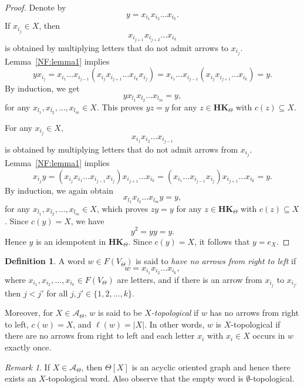 \documentclass[pdflatex,sn-mathphys-num]{sn-jnl}
\newcommand{\hk}{\mathbf{HK}_{\Theta}}
\theoremstyle{definition}
\newtheorem{definition}[theorem]{Definition}
\theoremstyle{remark}
\newtheorem{remark}[theorem]{Remark}
\begin{document}
\begin{proof}
   Denote by 
   \[
   y = x_{i_1} x_{i_2} \dots x_{i_k}.
   \]
   If $x_{i_j} \in X$, then
   \[
   x_{i_{j+1}} x_{i_{j+2}} \dots x_{i_k}
   \]
   is obtained by multiplying letters that do not admit arrows to $x_{i_j}$.
   Lemma~\ref{NF:lemma1} implies
   \[
   y x_{i_j} = x_{i_1} \dots x_{i_{j-1}} (x_{i_j} x_{i_{j+1}} \dots x_{i_k} x_{i_j}) = x_{i_1} \dots x_{i_{j-1}} (x_{i_j} x_{i_{j+1}} \dots x_{i_k}) = y.
   \]
   By induction, we get 
   \[
   y x_{l_1} x_{l_2} \dots x_{l_m} = y,
   \]
   for any $x_{l_1}, x_{l_2}, \dots, x_{l_m} \in X$.
   This proves $yz = y$ for any $z \in \hk$ with $c(z) \subseteq X$.

   For any $x_{i_j} \in X$,
   \[
   x_{i_1} x_{i_2} \dots x_{i_{j-1}}
   \]
   is obtained by multiplying letters that do not admit arrows from $x_{i_j}$.
   Lemma~\ref{NF:lemma1} implies
   \[
   x_{i_j} y = (x_{i_j} x_{i_1} \dots x_{i_{j-1}} x_{i_j}) x_{i_{j+1}} \dots x_{i_k} = (x_{i_1} \dots x_{i_{j-1}} x_{i_j}) x_{i_{j+1}} \dots x_{i_k} = y.
   \]
   By induction, we again obtain 
   \[
   x_{l_1} x_{l_2} \dots x_{l_m} y = y,
   \]
   for any $x_{l_1}, x_{l_2}, \dots, x_{l_m} \in X$, which proves $zy = y$ for any $z \in \hk$ with $c(z) \subseteq X$.
   Since $c(y) = X$, we have
   \[
   y^2 = y y = y.
   \]
   Hence $y$ is an idempotent in $\hk$.
   Since $c(y) = X$, it follows that $y = e_X$.
\end{proof}

\begin{definition}
   A word $w \in F(V_{\Theta})$ is said to \emph{have no arrows from right to left} if 
   \[
   w = x_{i_1} x_{i_2} \dots x_{i_k},
   \]
   where $x_{i_1}, x_{i_2}, \dots, x_{i_k} \in F(V_{\Theta})$ are letters, and if there is an arrow from $x_{i_j}$ to $x_{i_{j'}}$ then $j < j'$ for all $j, j' \in \{1, 2, \dots, k\}$.

   Moreover, for $X \in \mathcal{A}_{\Theta}$, $w$ is said to be \emph{$X$-topological} if $w$ has no arrows from right to left, $c(w) = X$, and $\ell(w) = |X|$.
   In other words, $w$ is $X$-topological if there are no arrows from right to left and each letter $x_i$ with $x_i \in X$ occurs in $w$ exactly once.
\end{definition}

\begin{remark}\label{remark-top}
   If $X \in \mathcal{A}_{\Theta}$, then $\Theta[X]$ is an acyclic oriented graph and hence there exists an $X$-topological word.
   Also observe that the empty word is $\emptyset$-topological.
\end{remark}
\end{document}
